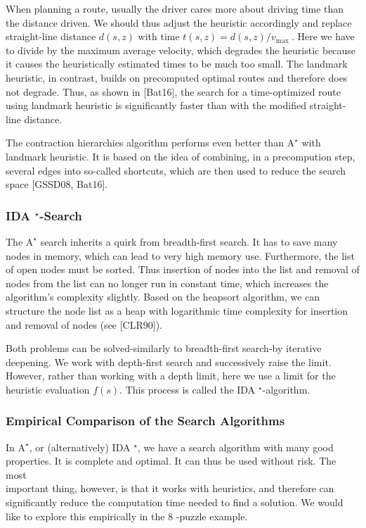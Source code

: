 \documentclass[10pt]{article}
\begin{document}
When planning a route, usually the driver cares more about driving time than the distance driven. We should thus adjust the heuristic accordingly and replace straight-line distance $d(s, z)$ with time $t(s, z)=d(s, z) / v_{\text {max }}$. Here we have to divide by the maximum average velocity, which degrades the heuristic because it causes the heuristically estimated times to be much too small. The landmark heuristic, in contrast, builds on precomputed optimal routes and therefore does not degrade. Thus, as shown in [Bat16], the search for a time-optimized route using landmark heuristic is significantly faster than with the modified straight-line distance.

The contraction hierarchies algorithm performs even better than $\mathrm{A}^{\star}$ with landmark heuristic. It is based on the idea of combining, in a precompution step, several edges into so-called shortcuts, which are then used to reduce the search space [GSSD08, Bat16].

\subsubsection*{IDA ${ }^{\star}$-Search}
The $\mathrm{A}^{\star}$ search inherits a quirk from breadth-first search. It has to save many nodes in memory, which can lead to very high memory use. Furthermore, the list of open nodes must be sorted. Thus insertion of nodes into the list and removal of nodes from the list can no longer run in constant time, which increases the algorithm's complexity slightly. Based on the heapsort algorithm, we can structure the node list as a heap with logarithmic time complexity for insertion and removal of nodes (see [CLR90]).

Both problems can be solved-similarly to breadth-first search-by iterative deepening. We work with depth-first search and successively raise the limit. However, rather than working with a depth limit, here we use a limit for the heuristic evaluation $f(s)$. This process is called the IDA ${ }^{\star}$-algorithm.

\subsubsection*{Empirical Comparison of the Search Algorithms}
In $\mathrm{A}^{\star}$, or (alternatively) IDA ${ }^{\star}$, we have a search algorithm with many good properties. It is complete and optimal. It can thus be used without risk. The most\\
important thing, however, is that it works with heuristics, and therefore can significantly reduce the computation time needed to find a solution. We would like to explore this empirically in the 8 -puzzle example.
\end{document}
